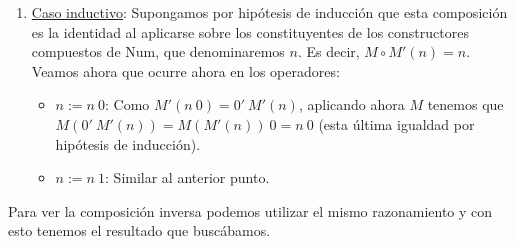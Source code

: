 \begin{sol}
\begin{enumerate}
        \item \underline{Caso inductivo}: Supongamos por hipótesis de inducción
            que esta composición es la identidad al aplicarse sobre los
            constituyentes de los constructores compuestos de $\mathrm{Num}$,
            que denominaremos $n$. Es decir, $M \circ M' \left( n \right) = n$.
            Veamos ahora que ocurre ahora en los operadores:
            \begin{itemize}
                \item \underline{$n := n\ 0$}: Como $M'\left( n\ 0 \right) = 0'\ M'\left( n
                    \right)$, aplicando ahora $M$ tenemos que $M\left( 0'\
                    M'\left( n \right) \right) = M\left( M'\left( n \right)
                    \right)\ 0 = n\ 0$ (esta última igualdad por hipótesis de
                    inducción).

                \item \underline{$n := n\ 1$}: Similar al anterior punto.
            \end{itemize}
    \end{enumerate}
    Para ver la composición inversa podemos utilizar el mismo razonamiento y con
    esto tenemos el resultado que buscábamos.
\end{sol}
